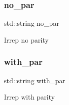\subsubsection{\texorpdfstring{no\_par}{no\_par}}
{\footnotesize\ttfamily std\+::string no\+\_\+par}

Irrep no parity \mbox{\label{adat-devel_2lib_2hadron_2irrep__util_8cc_ab9fdb201372ae6396663081a0b97903d}} 
\subsubsection{\texorpdfstring{with\_par}{with\_par}}
{\footnotesize\ttfamily std\+::string with\+\_\+par}

Irrep with parity 